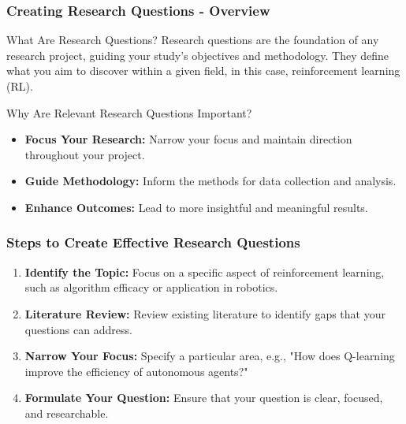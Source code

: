 \documentclass[aspectratio=169]{beamer}
\begin{document}
\begin{frame}[fragile]
    \frametitle{Creating Research Questions - Overview}
    \begin{block}{What Are Research Questions?}
        Research questions are the foundation of any research project, guiding your study's objectives and methodology. They define what you aim to discover within a given field, in this case, reinforcement learning (RL).
    \end{block}

    \begin{block}{Why Are Relevant Research Questions Important?}
        \begin{itemize}
            \item \textbf{Focus Your Research:} Narrow your focus and maintain direction throughout your project.
            \item \textbf{Guide Methodology:} Inform the methods for data collection and analysis.
            \item \textbf{Enhance Outcomes:} Lead to more insightful and meaningful results.
        \end{itemize}
    \end{block}
\end{frame}

\begin{frame}[fragile]
    \frametitle{Steps to Create Effective Research Questions}
    \begin{enumerate}
        \item \textbf{Identify the Topic:}
            Focus on a specific aspect of reinforcement learning, such as algorithm efficacy or application in robotics.
        
        \item \textbf{Literature Review:}
            Review existing literature to identify gaps that your questions can address.
        
        \item \textbf{Narrow Your Focus:}
            Specify a particular area, e.g., "How does Q-learning improve the efficiency of autonomous agents?"
        
        \item \textbf{Formulate Your Question:}
            Ensure that your question is clear, focused, and researchable.
    \end{enumerate}
\end{frame}
\end{document}
